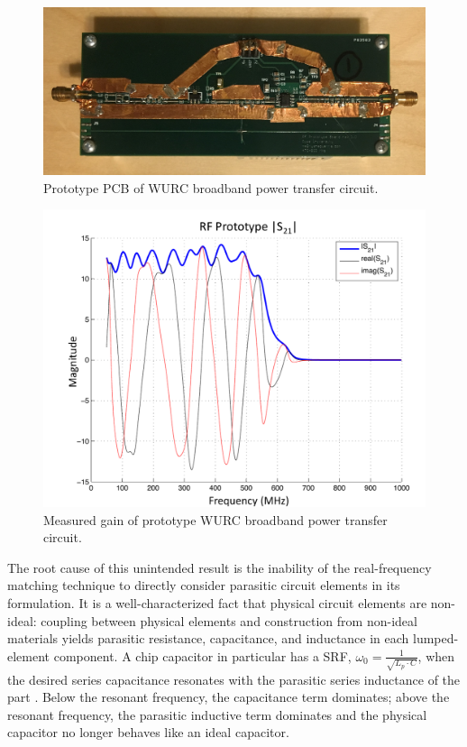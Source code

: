 \begin{figure}[p]
\centering
  \includegraphics[width=1\linewidth]{figs/matching/rf_protoboard}   
    \caption{Prototype PCB of WURC broadband power transfer circuit.}
\label{fig_match_proto_pcb}
\end{figure}

\begin{figure}[p]
\centering
  \includegraphics[width=0.8\linewidth]{figs/matching/RF_Protoboard_S21_measured}   
    \caption{Measured gain of prototype WURC broadband power transfer circuit.}
\label{fig_match_proto_gain}
\end{figure}


	The root cause of this unintended result is the inability of the real-frequency matching technique to directly consider parasitic circuit elements in its formulation.
	It is a well-characterized fact that physical circuit elements are non-ideal: coupling between physical elements and construction from non-ideal materials yields parasitic resistance, capacitance, and inductance in each lumped-element component.
	A chip capacitor in particular has a \ac{SRF}, $\omega_0 = \frac{1}{\sqrt{L_p\cdot C}}$, when the desired series capacitance resonates with the parasitic series inductance of the part \cite{murata2010srf}.
	Below the resonant frequency, the capacitance term dominates; above the resonant frequency, the parasitic inductive term dominates and the physical capacitor no longer behaves like an ideal capacitor.
	
